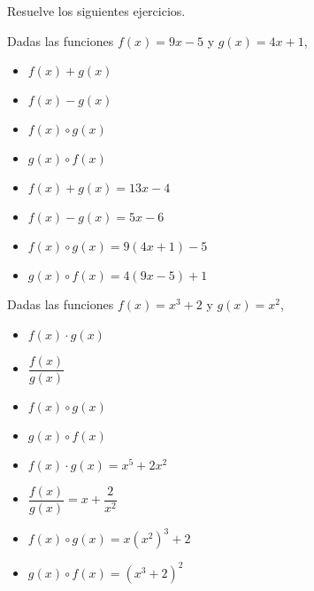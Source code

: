 Resuelve los siguientes ejercicios.
\begin{ex}
	Dadas las funciones $f(x) = 9x-5$ y $g(x) = 4x+1$, 
	\begin{itemize}
		\item $f(x) + g(x)$
		\item $f(x) - g(x)$
		\item $f(x) \circ g(x)$
		\item $g(x) \circ f(x)$
	\end{itemize}
	\begin{sol}
		\begin{itemize}		
			\item $f(x) + g(x) = 13x-4$
			\item $f(x) - g(x) = 5x-6$
			\item $f(x) \circ g(x) = 9(4x+1)-5$
			\item $g(x) \circ f(x) = 4(9x-5)+1$
		\end{itemize}
	\end{sol}
\end{ex}


\vspace{1cm}


\begin{ex}
	Dadas las funciones $f(x) = x^3+2$ y $g(x) =x^2$, 
	\begin{itemize}
		\item $f(x) \cdot g(x)$
		\item $ \dfrac{f(x)}{g(x)}$
		\item $f(x) \circ g(x)$
		\item $g(x) \circ f(x)$
	\end{itemize}

	\begin{sol}
		\begin{itemize}
			\item $f(x) \cdot g(x) = x^5+2x^2$
			\item $ \dfrac{f(x)}{g(x)} = x+\dfrac{2}{x^2}$
			\item $f(x) \circ g(x) = x(x^2)^3+2$
			\item $g(x) \circ f(x) = (x^3+2)^2$
		\end{itemize}
	\end{sol}
\end{ex}

\vspace{1cm}



